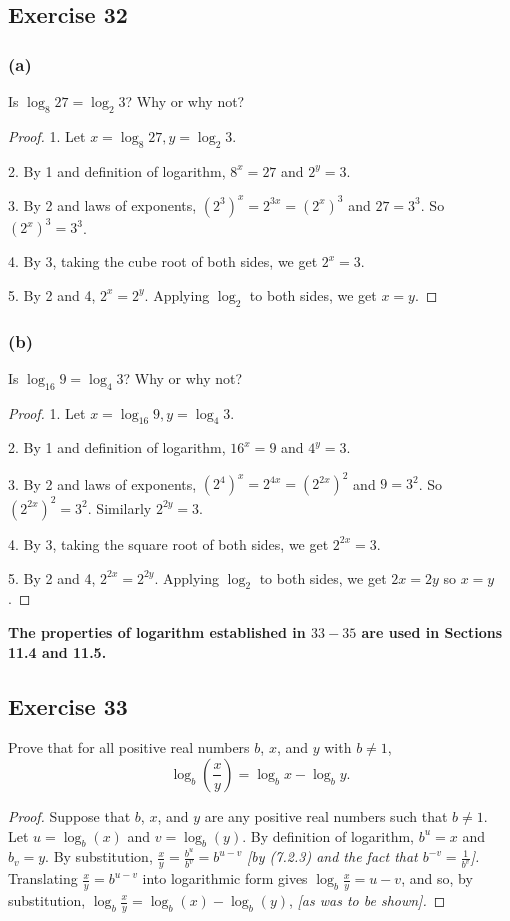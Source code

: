 \documentclass[14pt]{extarticle}
\newcommand{\cy}{\color{cyan}}
\begin{document}
\subsection{Exercise 32}
\subsubsection{(a)}
Is \(\log_8 27 = \log_2 3\)? Why or why not?

\begin{proof}
1. Let \(x = \log_8 27, y = \log_2 3\).

2. By 1 and definition of logarithm, \(8^x = 27\) and \(2^y = 3\).

3. By 2 and laws of exponents, \((2^3)^x = 2^{3x} = (2^x)^3\) and \(27 = 3^3\). So \((2^x)^3 = 3^3\).

4. By 3, taking the cube root of both sides, we get \(2^x = 3\).

5. By 2 and 4, \(2^x = 2^y\). Applying \(\log_2\) to both sides, we get $x = y$.
\end{proof}

\subsubsection{(b)}
Is \(\log_{16} 9 = \log_4 3\)? Why or why not?

\begin{proof}
1. Let \(x = \log_{16} 9, y = \log_4 3\).

2. By 1 and definition of logarithm, \(16^x = 9\) and \(4^y = 3\).

3. By 2 and laws of exponents, \((2^4)^x = 2^{4x} = (2^{2x})^2\) and \(9 = 3^2\). So \((2^{2x})^2 = 3^2\).
Similarly \(2^{2y} = 3\).

4. By 3, taking the square root of both sides, we get \(2^{2x} = 3\).

5. By 2 and 4, \(2^{2x} = 2^{2y}\). Applying \(\log_2\) to both sides, we get $2x = 2y$ so $x = y$.
\end{proof}

{\bf \cy The properties of logarithm established in $33-35$ are used in Sections 11.4 and 11.5.}

\subsection{Exercise 33}
Prove that for all positive real numbers $b$, $x$, and $y$ with \(b \neq 1\),
\[
\log_b\left(\frac{x}{y}\right) = \log_b x - \log_b y.
\]
\begin{proof}
Suppose that $b$, $x$, and $y$ are any positive real numbers such that \(b \neq 1\). Let \(u = \log_b(x)\) and 
\(v = \log_b(y)\). By definition of logarithm, \(b^u = x\) and \(b_v = y\). By substitution, \(\frac{x}{y} = 
\frac{b^u}{b^v} = b^{u-v}\) {\it [by (7.2.3) and the fact that \(b^{-v} = \frac{1}{b^v}\)].} Translating 
\(\frac{x}{y} = b^{u-v}\) into logarithmic form gives \(\log_b \frac{x}{y} = u-v\), and so, by substitution, 
\(\log_b \frac{x}{y} = \log_b(x) - \log_b(y)\), {\it [as was to be shown].}
\end{proof}
\end{document}
